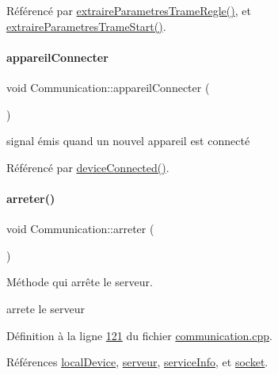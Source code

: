Référencé par \hyperlink{communication_8cpp_source_l00279}{extraire\+Parametres\+Trame\+Regle()}, et \hyperlink{communication_8cpp_source_l00243}{extraire\+Parametres\+Trame\+Start()}.

\mbox{\label{class_communication_ae05ddbb1481cfb64f493940b6db8ed29}} 
\paragraph{\texorpdfstring{appareil\+Connecter}{appareilConnecter}}
{\footnotesize\ttfamily void Communication\+::appareil\+Connecter (\begin{DoxyParamCaption}{ }\end{DoxyParamCaption})\hspace{0.3cm}{\ttfamily [signal]}}



signal émis quand un nouvel appareil est connecté 



Référencé par \hyperlink{communication_8cpp_source_l00329}{device\+Connected()}.

\mbox{\label{class_communication_a1f4b02441803f9c8e231cb9f304d776b}} 
\paragraph{\texorpdfstring{arreter()}{arreter()}}
{\footnotesize\ttfamily void Communication\+::arreter (\begin{DoxyParamCaption}{ }\end{DoxyParamCaption})}



Méthode qui arrête le serveur. 

arrete le serveur 

Définition à la ligne \hyperlink{communication_8cpp_source_l00121}{121} du fichier \hyperlink{communication_8cpp_source}{communication.\+cpp}.



Références \hyperlink{communication_8h_source_l00096}{local\+Device}, \hyperlink{communication_8h_source_l00094}{serveur}, \hyperlink{communication_8h_source_l00097}{service\+Info}, et \hyperlink{communication_8h_source_l00095}{socket}.



